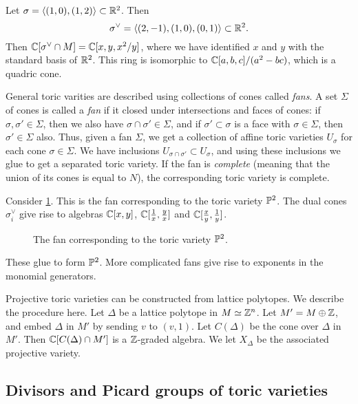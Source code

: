 \begin{example}
Let $\sigma=\langle (1,0), (1,2) \rangle \subset \R^2$. Then
\[
\sigma^\vee = \langle (2,-1),(1,0),(0,1) \rangle \subset \R^2.
\]
Then $\C[\sigma^\vee \cap M] = \C[x,y,x^2/y]$, where we have identified $x$ and $y$ with the standard basis of $\R^2$. This ring is isomorphic to $\C[a,b,c]/(a^2-bc)$, which is a quadric cone.
\end{example}

General toric varities are described using collections of cones called \emph{fans}. A set $\Sigma$ of cones is called a \emph{fan} if it closed under intersections and faces of cones: if $\sigma, \sigma' \in \Sigma$, then we also have $\sigma \cap \sigma' \in \Sigma$, and if $\sigma' \subset \sigma$ is a face with $\sigma \in \Sigma$, then $\sigma' \in \Sigma$ also. Thus, given a fan $\Sigma$, we get a collection of affine toric varieties $U_\sigma$ for each cone $\sigma \in \Sigma$. We have inclusions $U_{\sigma \cap \sigma'} \subset U_\sigma$, and using these inclusions we glue to get a separated toric variety. If the fan is \emph{complete} (meaning that the union of its cones is equal to $N$), the corresponding toric variety is complete. 

\begin{example}
Consider \cref{fig:p2fan}. This is the fan corresponding to the toric variety $\P^2$. The dual cones $\sigma_i^\vee$ give rise to algebras $\C[x,y]$, $\C[\frac 1x, \frac yx]$ and $\C[\frac xy, \frac 1y]$.
\begin{figure}
\centering 

\caption{The fan corresponding to the toric variety $\P^2$.}
\label{fig:p2fan}
\end{figure}
These glue to form $\P^2$. More complicated fans give rise to exponents in the monomial generators.
\end{example}

Projective toric varieties can be constructed from lattice polytopes. We describe the procedure here. Let $\Delta$ be a lattice polytope in $M \simeq \Z^n$. Let $M' = M \oplus \Z$, and embed $\Delta$ in $M'$ by sending $v$ to $(v,1)$. Let $C(\Delta)$ be the cone over $\Delta$ in $M'$. Then $\C[C(\Delta) \cap M']$ is a $\Z$-graded algebra. We let $X_\Delta$ be the associated projective variety. 

\subsection{Divisors and Picard groups of toric varieties}

